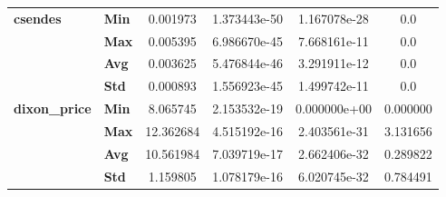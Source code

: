 \begin{longtable}{llcccc}
\cline{1-6}
\multirow{4}{*}{\textbf{csendes}} & \textbf{Min} &  0.001973 &  1.373443e-50 &  1.167078e-28 &  0.0 \\
        & \textbf{Max} &  0.005395 &  6.986670e-45 &  7.668161e-11 &  0.0 \\
        & \textbf{Avg} &  0.003625 &  5.476844e-46 &  3.291911e-12 &  0.0 \\
        & \textbf{Std} &  0.000893 &  1.556923e-45 &  1.499742e-11 &  0.0 \\
\cline{1-6}
\multirow{4}{*}{\textbf{dixon_price}} & \textbf{Min} &     8.065745 &  2.153532e-19 &   0.000000e+00 &     0.000000 \\
            & \textbf{Max} &    12.362684 &  4.515192e-16 &   2.403561e-31 &     3.131656 \\
            & \textbf{Avg} &    10.561984 &  7.039719e-17 &   2.662406e-32 &     0.289822 \\
            & \textbf{Std} &     1.159805 &  1.078179e-16 &   6.020745e-32 &     0.784491 \\
\end{longtable}

